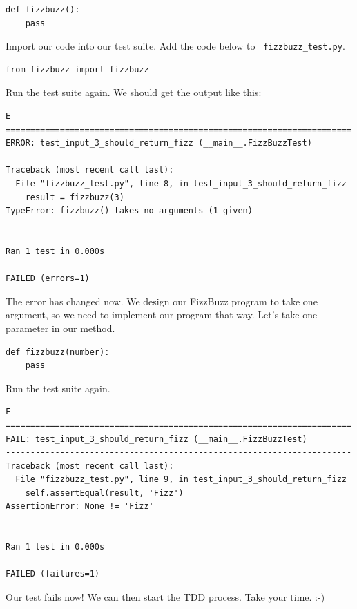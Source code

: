 \documentclass{article}
\begin{document}
\begin{verbatim}
def fizzbuzz():
    pass
\end{verbatim}

\noindent Import our code into our test suite. Add the code below to {\tt
fizzbuzz\_test.py}.

\begin{verbatim}
from fizzbuzz import fizzbuzz
\end{verbatim}

\noindent Run the test suite again. We should get the output like this:

\begin{verbatim}
E
======================================================================
ERROR: test_input_3_should_return_fizz (__main__.FizzBuzzTest)
----------------------------------------------------------------------
Traceback (most recent call last):
  File "fizzbuzz_test.py", line 8, in test_input_3_should_return_fizz
    result = fizzbuzz(3)
TypeError: fizzbuzz() takes no arguments (1 given)

----------------------------------------------------------------------
Ran 1 test in 0.000s

FAILED (errors=1)
\end{verbatim}

\noindent The error has changed now. We design our FizzBuzz program to take one
argument, so we need to implement our program that way. Let's take one
parameter in our method. \\

\begin{verbatim}
def fizzbuzz(number):
    pass
\end{verbatim}

\noindent Run the test suite again.

\begin{verbatim}
F
======================================================================
FAIL: test_input_3_should_return_fizz (__main__.FizzBuzzTest)
----------------------------------------------------------------------
Traceback (most recent call last):
  File "fizzbuzz_test.py", line 9, in test_input_3_should_return_fizz
    self.assertEqual(result, 'Fizz')
AssertionError: None != 'Fizz'

----------------------------------------------------------------------
Ran 1 test in 0.000s

FAILED (failures=1)
\end{verbatim}

\noindent Our test fails now! We can then start the TDD process. Take your
time. :-)
\end{document}
